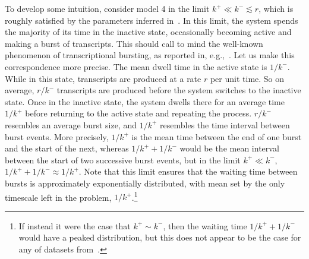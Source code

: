 To develop some intuition, consider model 4 in the limit $k^+ \ll k^- \lesssim
r$, which is roughly satisfied by the parameters inferred
in~\cite{Razo-Mejia2020}. In this limit, the system spends the majority of its
time in the inactive state, occasionally becoming active and making a burst of
transcripts. This should call to mind the well-known phenomenon of
transcriptional bursting, as reported in,
e.g.,~\cite{Golding2005,Chong2014,Sevier2016}. Let us make this correspondence more precise. The mean dwell
time in the active state is $1/k^-$. While in this state, transcripts are
produced at a rate $r$ per unit time. So on average, $r/k^-$ transcripts are
produced before the system switches to the inactive state. Once in the inactive
state, the system dwells there for an average time $1/k^+$ before returning to
the active state and repeating the process. $r/k^-$ resembles an average burst
size, and $1/k^+$ resembles the time interval between burst events. More
precisely, $1/k^+$ is the mean time between the end of one burst and the start
of the next, whereas $1/k^+ + 1/k^-$ would be the mean interval between the
start of two successive burst events, but in the limit $k^+ \ll k^-$, $1/k^+ +
1/k^- \approx 1/k^+$. Note that this limit ensures that the waiting time between
bursts is approximately exponentially distributed, with mean set by the only
timescale left in the problem, $1/k^+$.\footnote{If instead it were the case
that $k^+ \sim k^-$, then the waiting time $1/k^+ + 1/k^-$ would have a peaked
distribution, but this does not appear to be the case for any of datasets
from~\cite{Jones2014}.}

